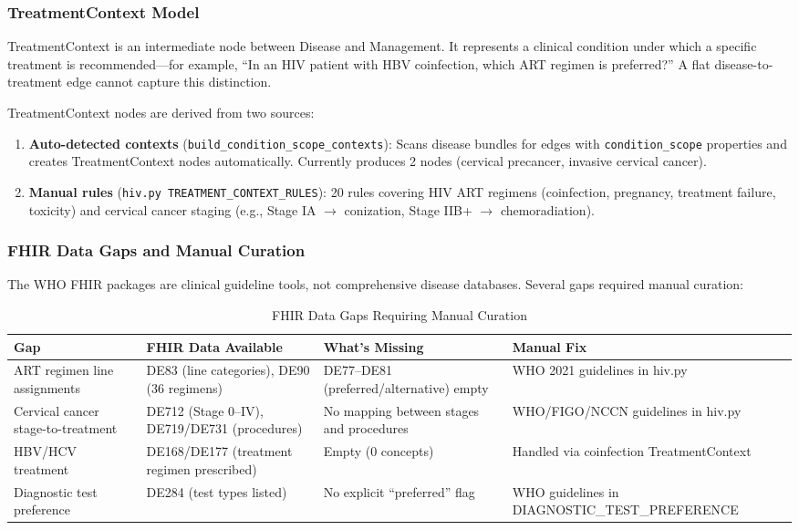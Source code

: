 \subsubsection{TreatmentContext Model}

TreatmentContext is an intermediate node between Disease and Management. It represents a clinical condition under which a specific treatment is recommended---for example, ``In an HIV patient with HBV coinfection, which ART regimen is preferred?'' A flat disease-to-treatment edge cannot capture this distinction.

TreatmentContext nodes are derived from two sources:
\begin{enumerate}
    \item \textbf{Auto-detected contexts} (\texttt{build\_condition\_scope\_contexts}): Scans disease bundles for edges with \texttt{condition\_scope} properties and creates TreatmentContext nodes automatically. Currently produces 2 nodes (cervical precancer, invasive cervical cancer).
    \item \textbf{Manual rules} (\texttt{hiv.py TREATMENT\_CONTEXT\_RULES}): 20 rules covering HIV ART regimens (coinfection, pregnancy, treatment failure, toxicity) and cervical cancer staging (e.g., Stage IA $\rightarrow$ conization, Stage IIB+ $\rightarrow$ chemoradiation).
\end{enumerate}

\subsubsection{FHIR Data Gaps and Manual Curation}

The WHO FHIR packages are clinical guideline tools, not comprehensive disease databases. Several gaps required manual curation:

\begin{table}[H]
\centering
\caption{FHIR Data Gaps Requiring Manual Curation}
\label{tab:fhir_gaps}
\begin{tabular}{p{3cm} p{3.5cm} p{3.5cm} p{3.5cm}}
\hline
\textbf{Gap} & \textbf{FHIR Data Available} & \textbf{What's Missing} & \textbf{Manual Fix} \\
\hline
ART regimen line assignments & DE83 (line categories), DE90 (36 regimens) & DE77--DE81 (preferred/alternative) empty & WHO 2021 guidelines in hiv.py \\
Cervical cancer stage-to-treatment & DE712 (Stage 0--IV), DE719/DE731 (procedures) & No mapping between stages and procedures & WHO/FIGO/NCCN guidelines in hiv.py \\
HBV/HCV treatment & DE168/DE177 (treatment regimen prescribed) & Empty (0 concepts) & Handled via coinfection TreatmentContext \\
Diagnostic test preference & DE284 (test types listed) & No explicit ``preferred'' flag & WHO guidelines in DIAGNOSTIC\_TEST\_PREFERENCE \\
\hline
\end{tabular}
\end{table}

